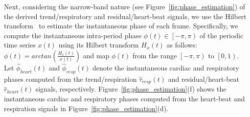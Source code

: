 \documentclass[runningheads,a4paper]{llncs}
\begin{document}
	Next, considering the narrow-band nature (see  Figure~\ref{fig:phase_estimation}) of the derived trend/respiratory and residual/heart-beat signals, we use the Hilbert transform~\cite{Lu2013} to estimate the instantaneous phase of each frame. Specifically, we compute the instantaneous intra-period phase $\phi(t) \in \left [  -\pi, \pi\right )$ of the periodic time series $x(t)$ using its Hilbert transform $H_x(t)$ as follows: $\phi(t) = arctan \left( \frac{H_x(t)}{x(t)}\right)$ and map $\phi(t)$ from the range $\left [  -\pi, \pi\right )$ to $\left [  0, 1\right )$. Let $\hat{\phi}_{heart}(t)$ and $\hat{\phi}_{resp}(t)$ denote the instantaneous cardiac and respiratory phases computed from the trend/respiration $\hat{\tau}_{resp}(t)$ and residual/heart-beat $\hat{r}_{heart}(t)$ signals, respectively. Figure~\ref{fig:phase_estimation}(f) shows the instantaneous cardiac and respiratory phases computed from the heart-beat and respiration signals in Figure~\ref{fig:phase_estimation}(d). 
%
\vspace{-0.3cm}
\end{document}
